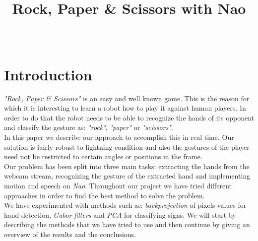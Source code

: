 \documentclass[a4paper, 11pt, twocolumn]{article}
\date{} %
\author{\fade{Nimrod Raiman [0336696]}\\\fade{Silvia L. Pintea [6109960]}}
\title{Rock, Paper \& Scissors with Nao}
\begin{document}
    \maketitle
    \section{Introduction}
	\label{sec:intro}
        \emph{"Rock, Paper \& Scissors"} is an easy and well known game. This is the reason for which it is interesting to learn a robot how to play it against human players. In order to do that the robot needs to be able to recognize the hands of its opponent and classify the gesture as: \emph{"rock"}, \emph{"paper"} or \emph{"scissors"}.\\	
		\hspace*{10px}In this paper we describe our approach to accomplish this in real time. Our solution is fairly robust to lightning condition and also the gestures of the player need not be restricted to certain angles or positions in the frame.\\ 
        \hspace*{10px}Our problem has been split into three main tasks: extracting the hands from the webcam stream, recognizing the gesture of the extracted hand and implementing motion and speech on \emph{Nao}. Throughout our project we have tried different approaches in order to find the best method to solve the problem.\\
		 \hspace*{10px}We have experimented with methods such as: \emph{backprojection} of pixels values for hand detection, \emph{Gabor filters} and \emph{PCA} for classifying signs. We will start by describing the methods that we have tried to use and then continue by giving an overview of the results and the conclusions.   
\end{document}
